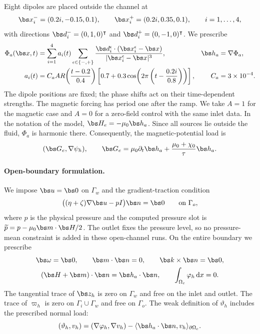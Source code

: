 Eight dipoles are placed outside the channel at
\[
 \bs x_i^-=(0.2i,-0.15,0.1),\qquad
 \bs x_i^+=(0.2i,0.35,0.1),\qquad i=1,\ldots,4,
\]
with directions $\bs d_i^-=(0,1,0)^{\intercal}$ and
$\bs d_i^+=(0,-1,0)^{\intercal}$.
We prescribe
\begin{align}
 \Phi_a(\bs x,t)
 &=\sum_{i=1}^4 a_i(t)
   \sum_{\epsilon\in\{-,+\}}
   \frac{\bs d_i^{\epsilon}\cdot(\bs x_i^{\epsilon}-\bs x)}
   {|\bs x_i^{\epsilon}-\bs x|^3},
 &\bs h_a&=\nabla\Phi_a,\label{eq:channel-dipoles}\\
 a_i(t)
 &=C_a A R\!\left(\frac{t-0.2}{0.4}\right)
 \left[0.7+0.3\cos\!\left(2\pi\left(t-\frac{0.2i}{0.8}\right)\right)\right],
 &C_a&=3\times10^{-4}.\label{eq:channel-pulse}
\end{align}
The dipole positions are fixed; the phase shifts act on their
time-dependent strengths. The magnetic forcing has period one after
the ramp. We take $A=1$ for the magnetic case and $A=0$ for a
zero-field control with the same inlet data.
In the notation of the model, $\bs H_e=-\mu_0\bs h_a$.
Since all sources lie outside the fluid, $\Phi_a$ is harmonic there.
Consequently, the magnetic-potential load is
\[
 (\bs G_e,\nabla\psi_h),\qquad
 \bs G_e=\mu_0\partial_t\bs h_a
       +\frac{\mu_0+\chi_0}{\tau}\bs h_a.
\]

\paragraph{Open-boundary formulation.}
We impose $\bs u=\bs0$ on $\Gamma_w$ and the gradient-traction condition
\begin{equation}\label{eq:channel-outlet}
 \bigl((\eta+\zeta)\nabla\bs u-pI\bigr)\bs n=\bs0
 \qquad\text{on }\Gamma_o,
\end{equation}
where $p$ is the physical pressure and the computed pressure slot is
$\widetilde p=p-\mu_0\bs m\cdot\bs H/2$.
The outlet fixes the pressure level, so no pressure-mean constraint is
added in these open-channel runs. On the entire boundary we prescribe
\begin{equation}\label{eq:channel-magnetic-boundary}
\begin{gathered}
 \bs\omega=\bs0,\qquad \bs m\cdot\bs n=0,\qquad
 \bs k\times\bs n=\bs0,\\
 (\bs H+\bs m)\cdot\bs n=\bs h_a\cdot\bs n,
 \qquad \int_{\Omega_c}\varphi_h\,\mathrm dx=0.
\end{gathered}
\end{equation}
The tangential trace of $\bs z_h$ is zero on $\Gamma_w$ and free
on the inlet and outlet. The trace of $\varpi_h$ is zero on
$\Gamma_i\cup\Gamma_w$ and free on $\Gamma_o$.
The weak definition of $\vartheta_h$ includes the prescribed normal load:
\[
 (\vartheta_h,v_h)
 =(\nabla\varphi_h,\nabla v_h)
   -\langle\bs h_a\cdot\bs n,v_h\rangle_{\partial\Omega_c}.
\]

